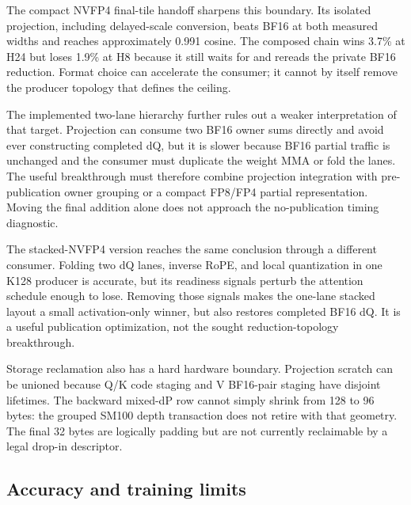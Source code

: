 The compact NVFP4 final-tile handoff sharpens this boundary.  Its isolated
projection, including delayed-scale conversion, beats BF16 at both measured
widths and reaches approximately 0.991 cosine.  The composed chain wins 3.7\%
at H24 but loses 1.9\% at H8 because it still waits for and rereads the private
BF16 reduction.  Format choice can accelerate the consumer; it cannot by
itself remove the producer topology that defines the ceiling.

The implemented two-lane hierarchy further rules out a weaker interpretation
of that target.  Projection can consume two BF16 owner sums directly and avoid
ever constructing completed dQ, but it is slower because BF16 partial traffic
is unchanged and the consumer must duplicate the weight MMA or fold the lanes.
The useful breakthrough must therefore combine projection integration with
pre-publication owner grouping or a compact FP8/FP4 partial representation.
Moving the final addition alone does not approach the no-publication timing
diagnostic.

The stacked-NVFP4 version reaches the same conclusion through a different
consumer.  Folding two dQ lanes, inverse RoPE, and local quantization in one
K128 producer is accurate, but its readiness signals perturb the attention
schedule enough to lose.  Removing those signals makes the one-lane stacked
layout a small activation-only winner, but also restores completed BF16 dQ.
It is a useful publication optimization, not the sought reduction-topology
breakthrough.

Storage reclamation also has a hard hardware boundary.  Projection scratch
can be unioned because Q/K code staging and V BF16-pair staging have disjoint
lifetimes.  The backward mixed-dP row cannot simply shrink from 128 to 96
bytes: the grouped SM100 depth transaction does not retire with that geometry.
The final 32 bytes are logically padding but are not currently reclaimable by
a legal drop-in descriptor.

\subsection{Accuracy and training limits}

